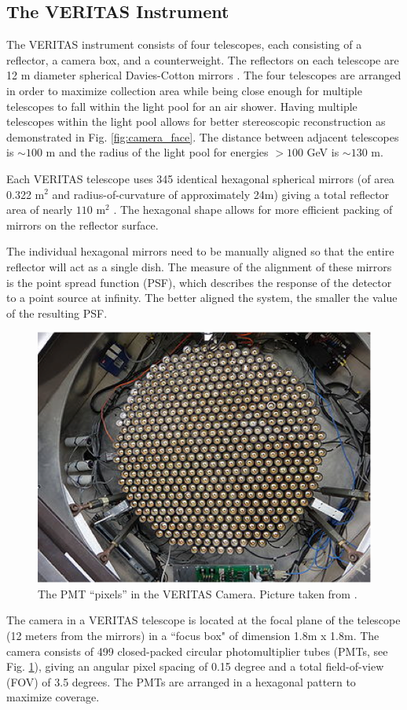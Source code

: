 \documentclass[main.tex]{subfiles}
\begin{document}
\subsection{The VERITAS Instrument}
The VERITAS instrument consists of four telescopes, each consisting of a reflector, a camera box, and a counterweight. The reflectors on each telescope are 12 m diameter spherical Davies-Cotton mirrors \cite{DaviesCotton}. The four telescopes are arranged in order to maximize collection area while being close enough for multiple telescopes to fall within the light pool for an air shower. Having multiple telescopes within the light pool allows for better stereoscopic reconstruction as demonstrated in Fig. \ref{fig:camera_face}. The distance between adjacent telescopes is $\sim 100$ m and the radius of the light pool for energies $>100$ GeV is $\sim 130$ m.\par

Each VERITAS telescope uses 345 identical hexagonal spherical mirrors (of area 0.322 m$^2$ and radius-of-curvature of approximately 24m) giving a total reflector area of nearly $110$ m$^2$ \cite{veritas_web}. The hexagonal shape allows for more efficient packing of mirrors on the reflector surface.\par
The individual hexagonal mirrors need to be manually aligned so that the entire reflector will act as a single dish. The measure of the alignment of these mirrors is the point spread function (PSF), which describes the response of the detector to a point source at infinity. The better aligned the system, the smaller the value of the resulting PSF.\par
\begin{figure}[htbp]
  \centering
  \includegraphics[width=0.58\linewidth]{images/Camera_PMT}
  \caption[PMTs in the VERITAS camera.]{The PMT ``pixels'' in the VERITAS Camera. Picture taken from \cite{Kieda:2013wom}.}
  \label{fig:VERITAS_Cam}
\end{figure}
The camera in a VERITAS telescope is located at the focal plane of the telescope (12 meters from the mirrors) in a ``focus box" of dimension 1.8m x 1.8m. The camera consists of 499 closed-packed circular photomultiplier tubes (PMTs, see Fig. \ref{fig:VERITAS_Cam}), giving an angular pixel spacing of 0.15 degree and a total field-of-view (FOV) of 3.5 degrees. The PMTs are arranged in a hexagonal pattern to maximize coverage.\par
\end{document}
